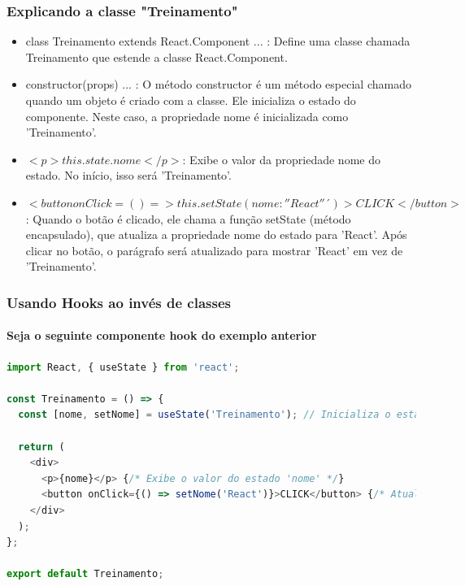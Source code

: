\documentclass[13pt, xcolor={dvipsnames,svgnames}, portuguese]{beamer}
\begin{document}
\begin{frame}
\frametitle{Explicando a classe "Treinamento"}
\begin{itemize}
 \item[1] class Treinamento extends React.Component { ... }: Define uma classe chamada Treinamento que estende a classe React.Component.
 \item[2] constructor(props) { ... }: O método constructor é um método especial chamado quando um objeto é criado com a classe. Ele inicializa o estado do componente. Neste caso, a propriedade nome é inicializada como 'Treinamento'.
 \item[3] $<p>{this.state.nome}</p>$: Exibe o valor da propriedade nome do estado. No início, isso será 'Treinamento'.
 
 \item[4] $<button onClick={() => this.setState({ nome: ''React''´ })}>CLICK</button>$: Quando o botão é clicado, ele chama a função setState (método encapsulado), que atualiza a propriedade nome do estado para 'React'. Após clicar no botão, o parágrafo será atualizado para mostrar 'React' em vez de 'Treinamento'.
\end{itemize}
\end{frame}

\begin{frame}[fragile]
\frametitle{Usando Hooks ao invés de classes}
\framesubtitle{Seja o seguinte componente hook do exemplo anterior}

\begin{lstlisting}[language=JavaScript]
import React, { useState } from 'react';

const Treinamento = () => {
  const [nome, setNome] = useState('Treinamento'); // Inicializa o estado com 'Treinamento'

  return (
    <div>
      <p>{nome}</p> {/* Exibe o valor do estado 'nome' */}
      <button onClick={() => setNome('React')}>CLICK</button> {/* Atualiza o estado 'nome' para 'React' quando o botao eh clicado */}
    </div>
  );
};

export default Treinamento;
\end{lstlisting}

\end{frame}






\end{document}
